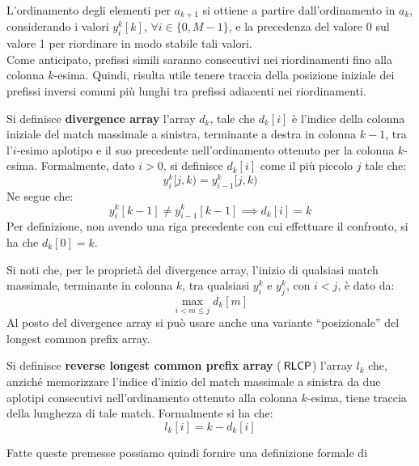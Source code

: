 L'ordinamento degli elementi per
$a_{k+1}$ si ottiene a partire 
dall'ordinamento in $a_k$, considerando i valori $y_i^k[k]$, $\forall
i\in\{0,M-1\}$, e la 
precedenza del valore 0 sul valore 1 per riordinare in modo stabile tali
valori.\\ 
Come anticipato, prefissi simili saranno consecutivi nei riordinamenti fino alla
colonna $k$-esima. Quindi, risulta utile tenere traccia della posizione iniziale
dei prefissi inversi comuni più lunghi tra prefissi adiacenti nei riordinamenti. 
\begin{definizione}
  Si definisce \textbf{divergence array} l'array $d_k$, tale che $d_k[i]$ è
  l'indice della colonna iniziale del match massimale a sinistra, terminante
  a destra in colonna
  $k-1$, tra 
  l'$i$-esimo aplotipo e il suo precedente nell'ordinamento ottenuto per la
  colonna $k$-esima. Formalmente, dato $i>0$, si definisce 
  $d_k[i]$ come il più piccolo $j$ tale che:
  \begin{equation}
    \label{eq:pbwtdiv}
    y_i^k[j,k)=y_{i-1}^k[j,k)
  \end{equation}
  Ne segue che:
  \begin{equation}
    \label{eq:pbwtdiv2}
    y_i^k[k-1]\neq y_{i-1}^k[k-1] \implies d_k[i]=k
  \end{equation}
  Per definizione, non avendo una riga precedente con cui effettuare il
  confronto, si ha che $d_k[0]=k$.
\end{definizione}
Si noti che, per le proprietà del divergence array, l'inizio di qualsiasi match
massimale, terminante 
in colonna $k$, tra qualsiasi $y_i^k$ e $y_j^k$, con $i<j$, è dato da:
\begin{equation}
  \label{eq:pbwtint}
  \max_{i<m\leq j}d_k[m]
\end{equation}
Al posto del divergence array si può usare anche una
variante ``posizionale'' del longest common prefix array.
\begin{definizione}
  Si definisce \textbf{reverse longest common prefix array} ($\,\mbox{\rm {\sf RLCP}}$) l'array
  $l_k$ 
  che, anziché 
  memorizzare l'indice d'inizio del match massimale a sinistra da due aplotipi
  consecutivi nell'ordinamento ottenuto alla colonna $k$-esima, tiene traccia
  della lunghezza di tale match. Formalmente si ha che:
  \begin{equation}
    \label{eq:pbwtlcp}
    l_k[i]=k-d_k[i]
  \end{equation}
\end{definizione}
\noindent
Fatte queste premesse possiamo quindi fornire una definizione formale di
